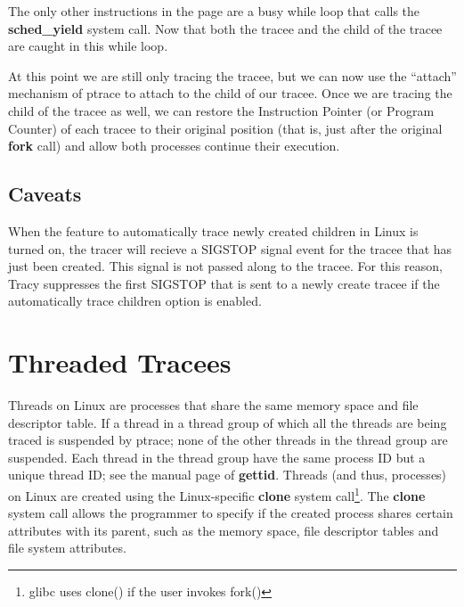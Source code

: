 \documentclass[a4paper, 10pt]{report}
\begin{document}
The only other instructions in the page are a busy while loop that
calls the \textbf{sched\_yield} system call.
Now that both the tracee and the child of the tracee are caught
in this while loop.

At this point we are still only tracing the tracee, but we can now use the
``attach'' mechanism of ptrace to attach to the child of our tracee. Once we are
tracing the child of the tracee as well, we can restore the Instruction Pointer
(or Program Counter) of each tracee to their original position
(that is, just after the original \textbf{fork} call) and allow both
processes continue their execution.



\subsection{Caveats}

When the feature to automatically trace newly created children in Linux
is turned on, the tracer will recieve a SIGSTOP signal event for the tracee
that has just been created. This signal is not passed along to the tracee.
For this reason, Tracy suppresses the first SIGSTOP that is sent
to a newly create tracee if the automatically trace children option
is enabled.

\section{Threaded Tracees}

Threads on Linux are processes that share the same memory space and file
descriptor table.
If a thread in a thread group of which all the threads are being traced
is suspended by ptrace; none of the other threads in the thread group are
suspended. Each thread in the thread group have the same process ID but a unique
thread ID; see the manual page of \textbf{gettid}.
Threads (and thus, processes) on Linux are created using the Linux-specific
\textbf{clone} system call\footnote{glibc uses clone() if the user invokes
fork()}. The \textbf{clone} system call allows the programmer to specify if the
created process shares certain attributes with its parent, such as the memory
space, file descriptor tables and file system attributes.
\end{document}
